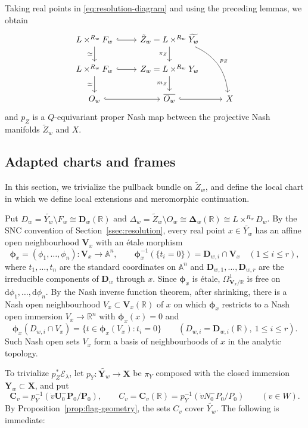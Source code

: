 \documentclass[a4paper,12pt]{amsart}
\numberwithin{equation}{section}
\theoremstyle{definition}
\theoremstyle{remark}
\newcommand{\pP}{\mathbf P}
\newcommand{\U}{\mathbf U}
\newcommand{\X}{\mathbf X}
\newcommand{\Y}{\mathbf Y}
\newcommand{\D}{\mathbf D}
\newcommand{\V}{\mathbf V}
\newcommand{\R}{\mathbb R}
\newcommand{\mcE}{\mathcal E}
\newcommand{\dd}{\mathrm d}
\newcommand{\cC}{\mathbf C}
\begin{document}
Taking real points in \eqref{eq:resolution-diagram} and using the preceding lemmas, we obtain
\[
\begin{tikzcd}
 L\times^{R_w}F_w\arrow[r,hook]\arrow[d,"\simeq"'] & \tilde Z_w=L\times^{R_w}\widetilde{Y_w}\arrow[d,"\pi_Z"']\arrow[rdd,bend left,"p_Z"] & \\
 L\times^{R_w}F_w\arrow[r,hook]\arrow[d,"\simeq"'] & Z_w=L\times^{R_w}Y_w\arrow[d,"m_Z"'] & \\
 O_w\arrow[r,hook] & \overline{O_w}\arrow[r,hook] & X
\end{tikzcd}
\]
and $p_Z$ is a $Q$-equivariant proper Nash map between the projective Nash manifolds $\tilde Z_w$ and $X$.

\subsection{Adapted charts and frames}\label{ssec:charts-frames}

In this section, we trivialize the pullback bundle on $\tilde Z_w$, and define the local chart in which we define local extensions and meromorphic continuation.

Put $D_w=\widetilde{Y_w}\setminus F_w\cong\D_w(\R)$ and $\Delta_w=\tilde Z_w\setminus O_w\cong\boldsymbol\Delta_w(\R)\cong L\times^{R_w}D_w$. By the SNC convention of Section~\ref{ssec:resolution}, every real point $x\in\widetilde{Y_w}$ has an affine open neighbourhood $\V_x$ with an \'etale morphism
\[
 \boldsymbol\phi_x=(\phi_1,\dots,\phi_n):\V_x\to\mathbb A^n,\qquad\boldsymbol\phi_x^{-1}(\{t_i=0\})=\D_{w,i}\cap\V_x\quad(1\le i\le r),
\]
where $t_1,\dots,t_n$ are the standard coordinates on $\mathbb A^n$ and $\D_{w,1},\dots,\D_{w,r}$ are the irreducible components of $\D_w$ through $x$. Since $\boldsymbol\phi_x$ is \'etale, $\Omega^1_{\V_x/\R}$ is free on $\dd\phi_1,\dots,\dd\phi_n$. By the Nash inverse function theorem, after shrinking, there is a Nash open neighbourhood $V_x\subset\V_x(\R)$ of $x$ on which $\boldsymbol\phi_x$ restricts to a Nash open immersion $V_x\to\R^n$ with $\boldsymbol\phi_x(x)=0$ and
\[
 \boldsymbol\phi_x(D_{w,i}\cap V_x)=\{t\in\boldsymbol\phi_x(V_x):t_i=0\}\qquad(D_{w,i}=\D_{w,i}(\R),\ 1\le i\le r).
\]
Such Nash open sets $V_x$ form a basis of neighbourhoods of $x$ in the analytic topology.

To trivialize $p_Z^*\mcE_\lambda$, let $p_Y:\widetilde{\Y_w}\to\X$ be $\pi_Y$ composed with the closed immersion $\Y_w\subset\X$, and put
\[
 \cC_v=p_Y^{-1}(\dot v\U_0^-\pP_0/\pP_0),\qquad C_v=\cC_v(\R)=p_Y^{-1}(\dot vN_0^-P_0/P_0)\qquad(v\in W).
\]
By Proposition~\ref{prop:flag-geometry}, the sets $C_v$ cover $\widetilde{Y_w}$.
The following is immediate:
\end{document}
